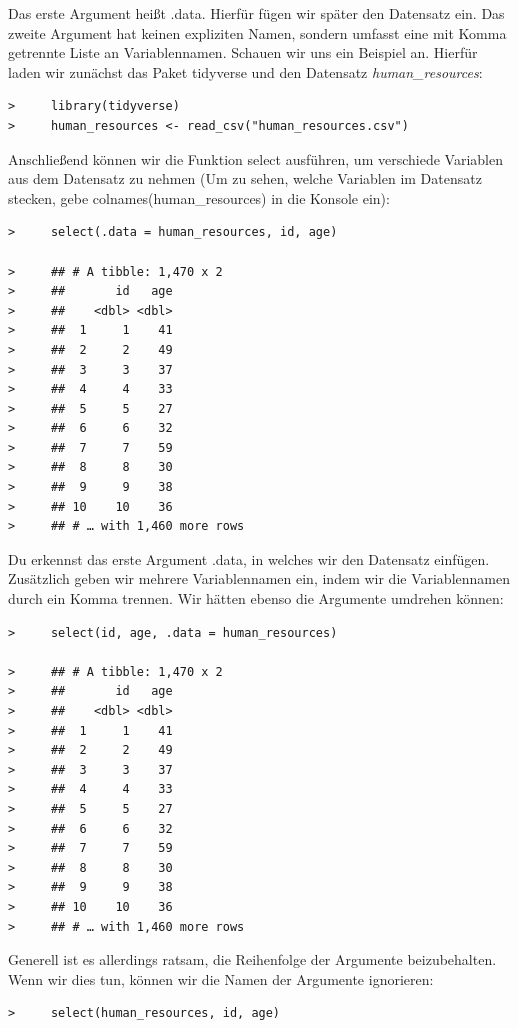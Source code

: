 \documentclass[
]{book}
\begin{document}
Das erste Argument heißt .data. Hierfür fügen wir später den Datensatz ein. Das zweite Argument hat keinen expliziten Namen, sondern umfasst eine mit Komma getrennte Liste an Variablennamen. Schauen wir uns ein Beispiel an. Hierfür laden wir zunächst das Paket tidyverse und den Datensatz \emph{human\_resources}:

\begin{verbatim}
>     library(tidyverse)
>     human_resources <- read_csv("human_resources.csv")
\end{verbatim}

Anschließend können wir die Funktion select ausführen, um verschiede Variablen aus dem Datensatz zu nehmen (Um zu sehen, welche Variablen im Datensatz stecken, gebe colnames(human\_resources) in die Konsole ein):

\begin{verbatim}
>     select(.data = human_resources, id, age)

>     ## # A tibble: 1,470 x 2
>     ##       id   age
>     ##    <dbl> <dbl>
>     ##  1     1    41
>     ##  2     2    49
>     ##  3     3    37
>     ##  4     4    33
>     ##  5     5    27
>     ##  6     6    32
>     ##  7     7    59
>     ##  8     8    30
>     ##  9     9    38
>     ## 10    10    36
>     ## # … with 1,460 more rows
\end{verbatim}

Du erkennst das erste Argument .data, in welches wir den Datensatz einfügen. Zusätzlich geben wir mehrere Variablennamen ein, indem wir die Variablennamen durch ein Komma trennen. Wir hätten ebenso die Argumente umdrehen können:

\begin{verbatim}
>     select(id, age, .data = human_resources)

>     ## # A tibble: 1,470 x 2
>     ##       id   age
>     ##    <dbl> <dbl>
>     ##  1     1    41
>     ##  2     2    49
>     ##  3     3    37
>     ##  4     4    33
>     ##  5     5    27
>     ##  6     6    32
>     ##  7     7    59
>     ##  8     8    30
>     ##  9     9    38
>     ## 10    10    36
>     ## # … with 1,460 more rows
\end{verbatim}

Generell ist es allerdings ratsam, die Reihenfolge der Argumente beizubehalten. Wenn wir dies tun, können wir die Namen der Argumente ignorieren:

\begin{verbatim}
>     select(human_resources, id, age)
\end{verbatim}
\end{document}
